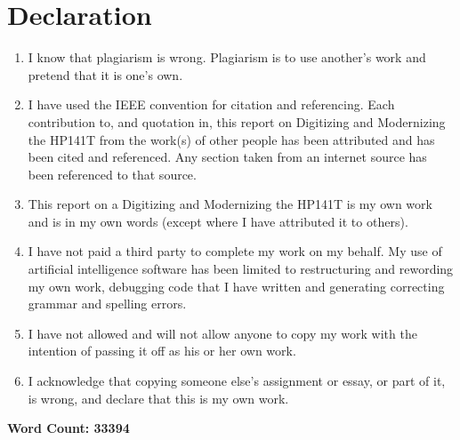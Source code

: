 {
\onehalfspacing
   
\chapter*{Declaration}

\vskip 10mm
\begin{enumerate}
\item
I know that plagiarism is wrong. Plagiarism is to use another’s work and pretend that it is one’s own.
\item 
I have used the IEEE convention for citation and referencing. Each contribution to, and quotation in, this report on Digitizing and Modernizing the HP141T from the work(s) of other people has been attributed and has been cited and referenced. Any section taken from an internet source has been referenced to that source.
\item 
This report on a Digitizing and Modernizing the HP141T is my own work and is in my own words (except where I have attributed it to others).
\item 
I have not paid a third party to complete my work on my behalf. My use of artificial intelligence software has been limited to restructuring and rewording my own work, debugging code that I have written and generating correcting grammar and spelling errors. 
\item 
I have not allowed and will not allow anyone to copy my work with the intention of passing it off as his or her own work.
\item 
I acknowledge that copying someone else’s assignment or essay, or part of it, is wrong, and declare that this is my own work.
\end{enumerate}
\vskip 30mm
\textbf{Word Count: 33394}
\par\noindent{}\hfill\makebox[2.0in]{\today}%
\par\noindent\makebox[2.5in]{\hrulefill} \hfill\makebox[2.0in]{\hrulefill}%
\par\noindent{}      \hfill{}%

}